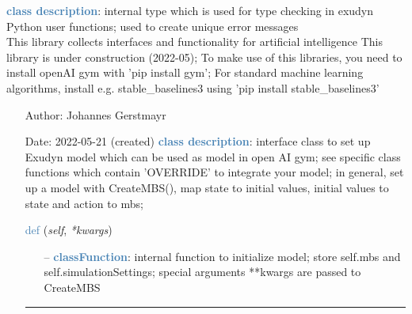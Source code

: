 \begin{itemize}[leftmargin=1.4cm]
%
\noindent\textcolor{steelblue}{{\bf class description}}:  internal type which is used for type checking in exudyn Python user functions; used to create unique error messages
\vspace{3pt} \\ 
\label{sec:module:artificialIntelligence}
  This library collects interfaces and functionality for artificial intelligence
           This library is under construction (2022-05);
           To make use of this libraries, you need to install openAI gym with 'pip install gym';
           For standard machine learning algorithms, install e.g. stable\_baselines3 using 'pip install stable\_baselines3'
\begin{itemize}[leftmargin=1.4cm]
\setlength{\itemindent}{-1.4cm}
\item[]Author:    Johannes Gerstmayr
\item[]Date:      2022-05-21 (created)
\ei
{}
\noindent\textcolor{steelblue}{{\bf class description}}:  interface class to set up Exudyn model which can be used as model in open AI gym;
         see specific class functions which contain 'OVERRIDE' to integrate your model;
         in general, set up a model with CreateMBS(), map state to initial values, initial values to state and action to mbs;
\vspace{3pt} \\ 
\begin{flushleft}
\noindent \textcolor{steelblue}{def {\bf {}}}\label{sec:artificialIntelligence:OpenAIGymInterfaceEnv(Env):__init__}
({\it self}, {\it **kwargs})
\end{flushleft}
\setlength{\itemindent}{0.7cm}
\begin{itemize}[leftmargin=0.7cm]
\item[--]\textcolor{steelblue}{\bf classFunction}: internal function to initialize model; store self.mbs and self.simulationSettings; special arguments **kwargs are passed to CreateMBS
\vspace{12pt}\end{itemize}
%
\noindent\rule{8cm}{0.75pt}\vspace{1pt} \\ 
\begin{flushleft}

\end{flushleft}
\end{itemize}
\end{itemize}
